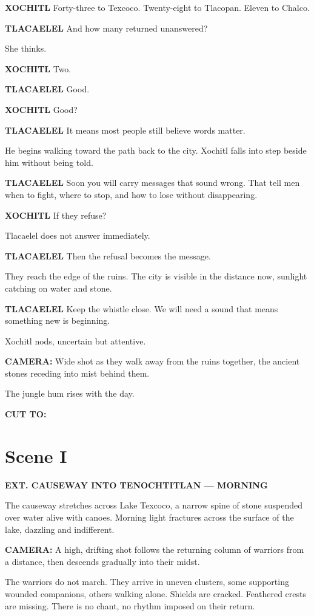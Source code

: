 \documentclass[12pt]{article}
\begin{document}
\textbf{XOCHITL}  
Forty-three to Texcoco.  
Twenty-eight to Tlacopan.  
Eleven to Chalco.

\textbf{TLACAELEL}  
And how many returned unanswered?

She thinks.

\textbf{XOCHITL}  
Two.

\textbf{TLACAELEL}  
Good.

\textbf{XOCHITL}  
Good?

\textbf{TLACAELEL}  
It means most people still believe words matter.

He begins walking toward the path back to the city. Xochitl falls into step beside him without being told.

\textbf{TLACAELEL}  
Soon you will carry messages that sound wrong.  
That tell men when to fight, where to stop,  
and how to lose without disappearing.

\textbf{XOCHITL}  
If they refuse?

Tlacaelel does not answer immediately.

\textbf{TLACAELEL}  
Then the refusal becomes the message.

They reach the edge of the ruins. The city is visible in the distance now, sunlight catching on water and stone.

\textbf{TLACAELEL}  
Keep the whistle close.  
We will need a sound that means  
something new is beginning.

Xochitl nods, uncertain but attentive.

\textbf{CAMERA:} Wide shot as they walk away from the ruins together, the ancient stones receding into mist behind them.

The jungle hum rises with the day.

\textbf{CUT TO:}

\section*{Scene I}

\textbf{EXT. CAUSEWAY INTO TENOCHTITLAN — MORNING}

The causeway stretches across Lake Texcoco, a narrow spine of stone suspended over water alive with canoes. Morning light fractures across the surface of the lake, dazzling and indifferent.

\textbf{CAMERA:} A high, drifting shot follows the returning column of warriors from a distance, then descends gradually into their midst.

The warriors do not march. They arrive in uneven clusters, some supporting wounded companions, others walking alone. Shields are cracked. Feathered crests are missing. There is no chant, no rhythm imposed on their return.
\end{document}
